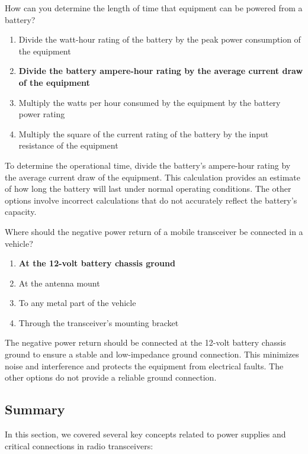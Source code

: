 \begin{tcolorbox}[colback=gray!10!white,colframe=black!75!black,title={T4A09}]
    How can you determine the length of time that equipment can be powered from a battery?
    \begin{enumerate}[label=\Alph*),noitemsep]
        \item Divide the watt-hour rating of the battery by the peak power consumption of the equipment
        \item \textbf{Divide the battery ampere-hour rating by the average current draw of the equipment}
        \item Multiply the watts per hour consumed by the equipment by the battery power rating
        \item Multiply the square of the current rating of the battery by the input resistance of the equipment
    \end{enumerate}
\end{tcolorbox}
To determine the operational time, divide the battery's ampere-hour rating by the average current draw of the equipment. This calculation provides an estimate of how long the battery will last under normal operating conditions. The other options involve incorrect calculations that do not accurately reflect the battery's capacity.


\begin{tcolorbox}[colback=gray!10!white,colframe=black!75!black,title={T4A11}]
    Where should the negative power return of a mobile transceiver be connected in a vehicle?
    \begin{enumerate}[label=\Alph*),noitemsep]
        \item \textbf{At the 12-volt battery chassis ground}
        \item At the antenna mount
        \item To any metal part of the vehicle
        \item Through the transceiver’s mounting bracket
    \end{enumerate}
\end{tcolorbox}
The negative power return should be connected at the 12-volt battery chassis ground to ensure a stable and low-impedance ground connection. This minimizes noise and interference and protects the equipment from electrical faults. The other options do not provide a reliable ground connection.


\subsection*{Summary}
In this section, we covered several key concepts related to power supplies and critical connections in radio transceivers:

